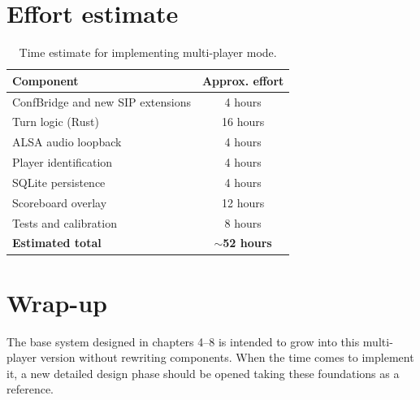 \section{Effort estimate}

\begin{table}[h]
\centering
\begin{tabular}{lc}
\toprule
\textbf{Component} & \textbf{Approx. effort} \\
\midrule
ConfBridge and new SIP extensions & 4 hours \\
Turn logic (Rust) & 16 hours \\
ALSA audio loopback & 4 hours \\
Player identification & 4 hours \\
SQLite persistence & 4 hours \\
Scoreboard overlay & 12 hours \\
Tests and calibration & 8 hours \\
\midrule
\textbf{Estimated total} & \textbf{$\sim$52 hours} \\
\bottomrule
\end{tabular}
\caption{Time estimate for implementing multi-player mode.}
\end{table}

\section{Wrap-up}

The base system designed in chapters 4--8 is intended to grow into this multi-player version without rewriting components. When the time comes to implement it, a new detailed design phase should be opened taking these foundations as a reference.
